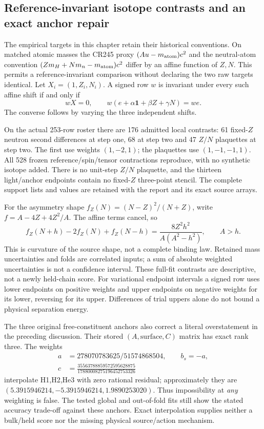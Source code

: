 \subsection{Reference-invariant isotope contrasts and an exact anchor repair}
\label{sec:reference-stencils-12}

The empirical targets in this chapter retain their historical conventions.
On matched atomic masses the CR245 proxy $(Au-m_{\rm atom})c^2$ and the
neutral-atom convention $(Zm_H+Nm_n-m_{\rm atom})c^2$ differ by an affine
function of $Z,N$. This permits a reference-invariant comparison without
declaring the two raw targets identical. Let $X_i=(1,Z_i,N_i)$. A signed
row $w$ is invariant under every such affine shift if and only if
\begin{equation}
 wX=0,\qquad
 w(e+\alpha\mathbf1+\beta Z+\gamma N)=we.
\end{equation}
The converse follows by varying the three independent shifts.

On the actual 253-row roster there are 176 admitted local contrasts:
61 fixed-$Z$ neutron second differences at step one, 68 at step two and
47 $Z/N$ plaquettes at step two. The first use weights $(1,-2,1)$;
the plaquettes use $(1,-1,-1,1)$. All 528 frozen reference/spin/tensor
contractions reproduce, with no synthetic isotope added. There is no
unit-step $Z/N$ plaquette, and the thirteen light/anchor endpoints contain
no fixed-$Z$ three-point stencil. The complete support lists and values
are retained with the report and its exact source arrays.

For the asymmetry shape $f_Z(N)=(N-Z)^2/(N+Z)$, write
$f=A-4Z+4Z^2/A$. The affine terms cancel, so
\begin{equation}
 f_Z(N+h)-2f_Z(N)+f_Z(N-h)
 =\frac{8Z^2h^2}{A(A^2-h^2)},\qquad A>h.
\end{equation}
This is curvature of the source shape, not a complete binding law.
Retained mass uncertainties and folds are correlated inputs; a sum of
absolute weighted uncertainties is not a confidence interval. These
full-fit contrasts are descriptive, not a newly held-chain score. For
variational endpoint intervals a signed row uses lower endpoints on
positive weights and upper endpoints on negative weights for its lower,
reversing for its upper. Differences of trial uppers alone do not bound
a physical separation energy.

The three original free-constituent anchors also correct a literal
overstatement in the preceding discussion. Their stored $(A,\text{surface},C)$
matrix has exact rank three. The weights
\begin{equation}
\begin{split}
 a&=278070783625/51574868504,\qquad b_s=-a,\\
 c&=\frac{35563788859572595628875}{17880008275196452753326}
\end{split}
\end{equation}
interpolate H1,H2,He3 with zero rational residual; approximately they are
$(5.3915946214,-5.3915946214,1.9890253020)$.
Thus impossibility at \emph{any} weighting is false. The tested global
and out-of-fold fits still show the stated accuracy trade-off against
these anchors. Exact interpolation supplies neither a bulk/held score
nor the missing physical source/action mechanism.
